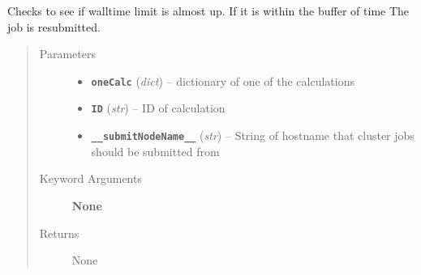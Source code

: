 \documentclass[letterpaper,10pt,english]{sphinxmanual}
\begin{document}
\begin{fulllineitems}
\label{run:run.__generic_restart_check}
Checks to see if walltime limit is almost up. If it is within the buffer of time
The job is resubmitted.
\begin{quote}\begin{description}
\item[{Parameters}] \leavevmode\begin{itemize}
\item {} 
\textbf{\texttt{oneCalc}} (\emph{dict}) -- dictionary of one of the calculations

\item {} 
\textbf{\texttt{ID}} (\emph{str}) -- ID of calculation

\item {} 
\textbf{\texttt{\_\_submitNodeName\_\_}} (\emph{str}) -- String of hostname that cluster jobs should be submitted from

\end{itemize}

\item[{Keyword Arguments}] \leavevmode
\textbf{None}

\item[{Returns}] \leavevmode
None

\end{description}\end{quote}

\end{fulllineitems}

\end{document}
